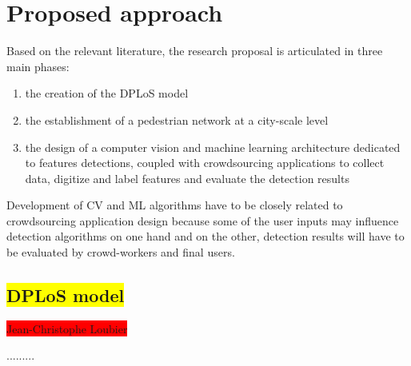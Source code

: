 \documentclass[10pt,conference,a4paper]{IEEEtran}
\begin{document}




\section{Proposed approach}
Based on the relevant literature, the research proposal is articulated in three main phases:
\begin{enumerate}
\renewcommand{\theenumi}{\Alph{enumi}}\setlength\itemsep{0.0em}
\item the creation of the DPLoS model
\item the establishment of a pedestrian network at a city-scale level %
\item the design of a computer vision and machine learning architecture dedicated to features detections, coupled with crowdsourcing applications to collect data, digitize and label features and evaluate the detection results
\end{enumerate}  

Development of CV and ML algorithms have to be closely related to crowdsourcing application design because some of the user inputs may influence detection algorithms on one hand and on the other, detection results will have to be evaluated by crowd-workers and final users. 


\subsection{\colorbox{yellow}{DPLoS model}}
\colorbox{red}{Jean-Christophe Loubier}

.........
\end{document}
